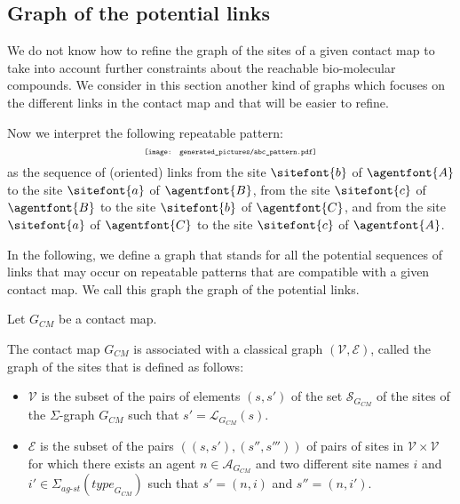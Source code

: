 \documentclass{entcs}
\newcommand{\graphsymb}{G}
\newcommand{\linksite}{\signaturesymb_{\textit{ag-st}}}
\newcommand{\signaturesymb}{\Sigma}
\newcommand{\agents}[1][\graphsymb]{\mathcal{A}_{#1}}
\newcommand{\type}[1][\graphsymb]{\textit{type}_{#1}}
\newcommand{\sites}[1][\graphsymb]{\mathcal{S}_{#1}}
\newcommand{\links}[1][\graphsymb]{\mathcal{L}_{#1}}
\begin{document}
\subsection{Graph of the potential links}

We do not know how to refine the graph of the sites of a given contact map to take into account further constraints about the reachable bio-molecular compounds. We consider in this section another kind of graphs which focuses on the different links in the contact map and that will be easier to refine.

Now we interpret the following repeatable pattern:
\begin{equation*}
\scalebox{0.6}{\texttt{[image: generated\_pictures/abc\_pattern.pdf]}}
\end{equation*}
as the sequence of (oriented) links from the
site $\sitefont{b}$ of $\agentfont{A}$ to the site
 $\sitefont{a}$ of $\agentfont{B}$,
 from the site $\sitefont{c}$ of $\agentfont{B}$ to the site $\sitefont{b}$ of $\agentfont{C}$,
 and from the site $\sitefont{a}$ of $\agentfont{C}$ to the site $\sitefont{c}$ of $\agentfont{A}$.

In the following, we define a graph that stands for all the potential sequences of links that may occur on repeatable patterns that are compatible with a given contact map. We call this graph the graph of the potential links.

\begin{defn}
  Let $\graphsymb_{\textit{CM}}$ be a contact map.

  The contact map $\graphsymb_{\textit{CM}}$ is associated with a classical graph $(\mathcal{V},\mathcal{E})$, called the graph of the sites that is defined as follows:
  \begin{itemize}
    \item $\mathcal{V}$ is the subset of the pairs of elements $(s,s')$ of the set  $\sites[\graphsymb_{\textit{CM}}]$ of the sites of the $\Sigma$-graph $\graphsymb_{\textit{CM}}$ such that $s'=\links[\graphsymb_{\textit{CM}}](s)$.
    \item $\mathcal{E}$ is the subset of the pairs $((s,s'),(s'',s'''))$ of pairs of sites in $\mathcal{V}\times\mathcal{V}$ for which  there exists an agent $n\in\agents[\graphsymb_{\textit{CM}}]$ and two different site names $i$ and $i' \in\linksite(\type[\graphsymb_{\textit{CM}}])$ such that $s'=(n,i)$ and $s''=(n,i')$.
  \end{itemize}
  \end{defn}
\end{document}
